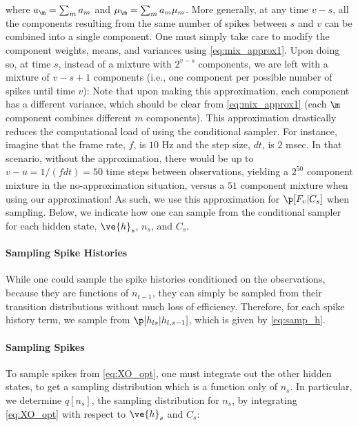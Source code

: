 \noindent where $a_\m=\sum_m a_m$ and $\mu_{\m}=\sum_m a_{m} \mu_{m}$.  More generally, at any time $v-s$, all the components resulting from the same number of spikes between $s$ and $v$ can be combined into a single component.  One must simply take care to modify the component weights, means, and variances using \eqref{eq:mix_approx1}.  Upon doing so, at time $s$, instead of a mixture with $2^{v-s}$ components, we are left with a mixture of $v-s+1$ components (i.e., one component per possible number of spikes until time $v$):
%
%
Note that upon making this approximation, each component has a different variance, which should be clear from \eqref{eq:mix_approx1} (each $\m$ component combines different $m$ components).  This approximation drastically reduces the computational load of using the conditional sampler.  For instance, imagine that the frame rate, $f$, is $10$ Hz and the step size, $dt$, is $2$ msec.  In that scenario, without the approximation, there would be up to $v-u=1/(f dt)=50$ time steps between observations, yielding a $2^{50}$ component mixture in the no-approximation situation, versus a $51$ component mixture when using our approximation!  As such, we use this approximation for $\p[F_v | C_s]$ when sampling.  Below, we indicate how one can sample from the conditional sampler for each hidden state, $\ve{h}_s$, $n_s$, and $C_s$.

\paragraph{Sampling Spike Histories}

While one could sample the spike histories conditioned on the observations, because they are functions of $n_{t-1}$, they can simply be sampled from their transition distributions without much loss of efficiency.  Therefore, for each spike history term, we sample from $\p[h_{ls} | h_{l,s-1}]$, which is given by \eqref{eq:samp_h}.

\paragraph{Sampling Spikes}

To sample spikes from \eqref{eq:XO_opt}, one must integrate out the other hidden states, to get a sampling distribution which is a function only of $n_s$.  In particular, we determine $q[n_s]$, the sampling distribution for $n_s$, by integrating \eqref{eq:XO_opt} with respect to $\ve{h}_s$ and $C_s$:

